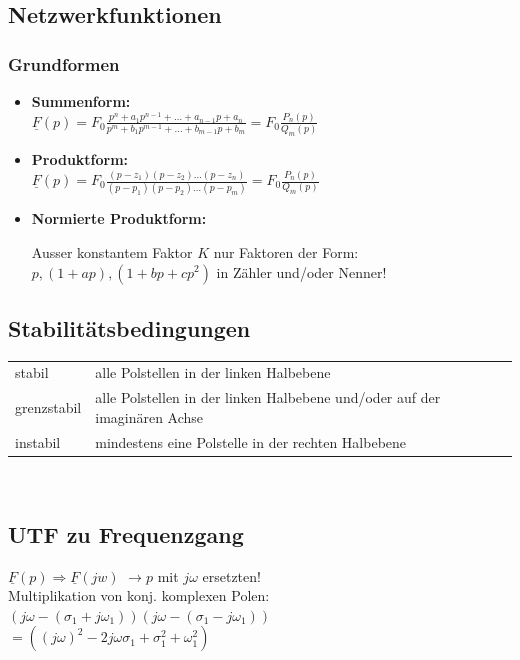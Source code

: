 \begin{multicols}{2}
\subsection{Netzwerkfunktionen}
\subsubsection{Grundformen}
	\begin{itemize}
		\item \textbf{Summenform:}\\
		 $\underline{F}(p) = F_0 \frac{p^n + a_1 p^{n-1} + \ldots + a_{n-1}p + a_n}{p^m+b_1 p^{m-1} + \ldots +b_{m-1}p+b_m} = F_0\frac{P_n(p)}{Q_m(p)}$
		\item \textbf{Produktform:}\\
		 $ \underline{F}(p) = F_0 \frac{(p-z_1)(p-z_2)\ldots(p-z_n)}{(p-p_1)(p-p_2)\ldots(p-p_m)}= F_0\frac{P_n(p)}{Q_m(p)}$
		\item \textbf{Normierte Produktform:}\\ \parbox{8cm}{Ausser konstantem Faktor $K$ nur Faktoren der Form: $p, (1+ap),(1+bp+cp^2)$ in Zähler und/oder Nenner!}
	\end{itemize}
	\columnbreak
\subsection{Stabilitätsbedingungen}
\begin{tabular}{ll}
	stabil & alle Polstellen in der linken Halbebene\\
	grenzstabil & alle Polstellen in der linken Halbebene und/oder auf der
	imaginären Achse\\
	instabil & mindestens eine Polstelle in der rechten Halbebene
\end{tabular}\\


\subsection{UTF zu Frequenzgang}
	$\underline{F}(p) \Rightarrow \underline{F}(jw)$
	$\rightarrow p$ mit $j\omega$ ersetzten!\\
	Multiplikation von konj. komplexen Polen:\\ 
		\hspace*{0.5cm}$(j\omega-(\sigma_1 + j\omega_1))(j\omega-(\sigma_1 - j\omega_1))$ \\ \hspace*{0.5cm}$= ((j\omega)^2-2j\omega\sigma_1+\sigma_1^2 +\omega_1^2)$
\end{multicols}

